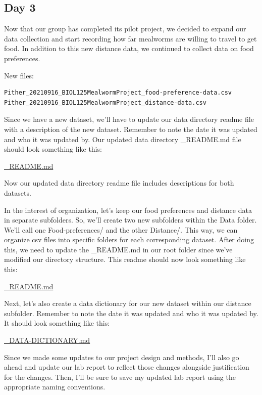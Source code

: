 \documentclass[
]{book}
\begin{document}
\hypertarget{day-3}{%
\subsection*{Day 3}\label{day-3}}

Now that our group has completed its pilot project, we decided to expand our data collection and start recording how far mealworms are willing to travel to get food. In addition to this new distance data, we continued to collect data on food preferences.

New files:

\begin{verbatim}
Pither_20210916_BIOL125MealwormProject_food-preference-data.csv
Pither_20210916_BIOL125MealwormProject_distance-data.csv
\end{verbatim}

Since we have a new dataset, we'll have to update our data directory readme file with a description of the new dataset. Remember to note the date it was updated and who it was updated by. Our updated data directory \_README.md file should look something like this:

\href{files/DS_biol-125-data-readme_V1.md}{\_README.md}

Now our updated data directory readme file includes descriptions for both datasets.

In the interest of organization, let's keep our food preferences and distance data in separate subfolders. So, we'll create two new subfolders within the Data folder. We'll call one Food-preferences/ and the other Distance/. This way, we can organize csv files into specific folders for each corresponding dataset. After doing this, we need to update the \_README.md in our root folder since we've modified our directory structure. This readme should now look something like this:

\href{files/DS_biol-125-readme_V1.md}{\_README.md}

Next, let's also create a data dictionary for our new dataset within our distance subfolder. Remember to note the date it was updated and who it was updated by. It should look something like this:

\href{files/DS_biol-125-data-dictionary-distance_V0.md}{\_DATA-DICTIONARY.md}

Since we made some updates to our project design and methods, I'll also go ahead and update our lab report to reflect those changes alongside justification for the changes. Then, I'll be sure to save my updated lab report using the appropriate naming conventions.
\end{document}
